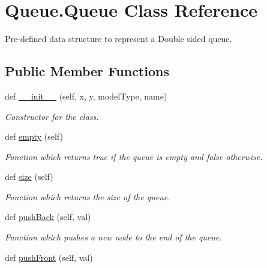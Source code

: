 \hypertarget{class_queue_1_1_queue}{}\section{Queue.\+Queue Class Reference}
\label{class_queue_1_1_queue}


Pre-\/defined data structure to represent a Double sided queue.  


\subsection*{Public Member Functions}
\begin{DoxyCompactItemize}
\item 
def \hyperlink{class_queue_1_1_queue_a775357405d27ad4bdf5ed097bee49665}{\+\_\+\+\_\+init\+\_\+\+\_\+} (self, x, y, model\+Type, name)
\begin{DoxyCompactList}\small\item\em Constructor for the class. \end{DoxyCompactList}\item 
\mbox{\label{class_queue_1_1_queue_a1472c6353f40c911d09da436ce8b2baa}} 
def \hyperlink{class_queue_1_1_queue_a1472c6353f40c911d09da436ce8b2baa}{empty} (self)
\begin{DoxyCompactList}\small\item\em Function which returns true if the queue is empty and false otherwise. \end{DoxyCompactList}\item 
\mbox{\label{class_queue_1_1_queue_a478b93022acfd9225f15868f5eda0410}} 
def \hyperlink{class_queue_1_1_queue_a478b93022acfd9225f15868f5eda0410}{size} (self)
\begin{DoxyCompactList}\small\item\em Function which returns the size of the queue. \end{DoxyCompactList}\item 
def \hyperlink{class_queue_1_1_queue_a6333268eb174c6fda6f9574e951710b2}{push\+Back} (self, val)
\begin{DoxyCompactList}\small\item\em Function which pushes a new node to the end of the queue. \end{DoxyCompactList}\item 
def \hyperlink{class_queue_1_1_queue_a17b55e82b5a8db529ff6a23a6b14bb03}{push\+Front} (self, val)

\end{DoxyCompactItemize}

